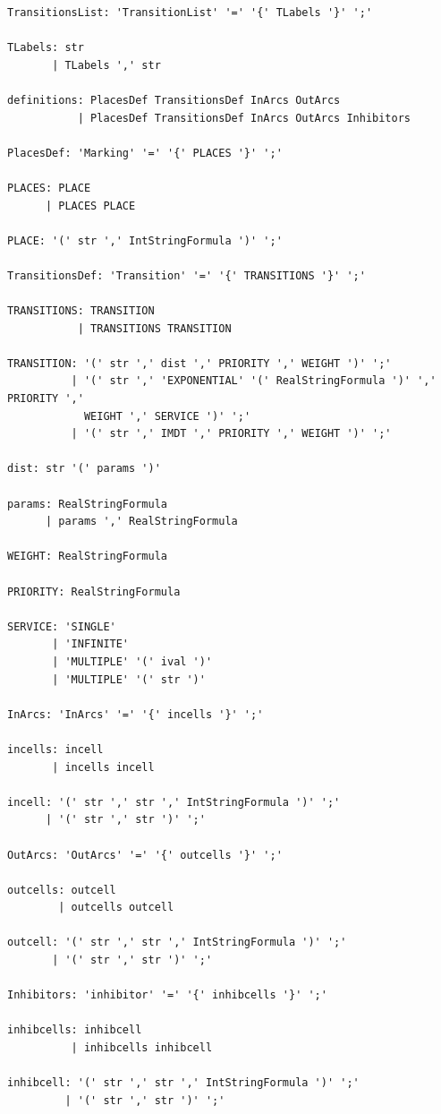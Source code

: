 \documentclass{article}
\begin{document}
\begin{verbatim}
TransitionsList: 'TransitionList' '=' '{' TLabels '}' ';'

TLabels: str
       | TLabels ',' str

definitions: PlacesDef TransitionsDef InArcs OutArcs
           | PlacesDef TransitionsDef InArcs OutArcs Inhibitors

PlacesDef: 'Marking' '=' '{' PLACES '}' ';'

PLACES: PLACE
      | PLACES PLACE

PLACE: '(' str ',' IntStringFormula ')' ';'

TransitionsDef: 'Transition' '=' '{' TRANSITIONS '}' ';'

TRANSITIONS: TRANSITION
           | TRANSITIONS TRANSITION

TRANSITION: '(' str ',' dist ',' PRIORITY ',' WEIGHT ')' ';'
          | '(' str ',' 'EXPONENTIAL' '(' RealStringFormula ')' ',' PRIORITY ',' 
            WEIGHT ',' SERVICE ')' ';'
          | '(' str ',' IMDT ',' PRIORITY ',' WEIGHT ')' ';'

dist: str '(' params ')'

params: RealStringFormula
      | params ',' RealStringFormula

WEIGHT: RealStringFormula

PRIORITY: RealStringFormula

SERVICE: 'SINGLE'
       | 'INFINITE'
       | 'MULTIPLE' '(' ival ')'
       | 'MULTIPLE' '(' str ')'

InArcs: 'InArcs' '=' '{' incells '}' ';'

incells: incell
       | incells incell

incell: '(' str ',' str ',' IntStringFormula ')' ';'
      | '(' str ',' str ')' ';'

OutArcs: 'OutArcs' '=' '{' outcells '}' ';'

outcells: outcell
        | outcells outcell

outcell: '(' str ',' str ',' IntStringFormula ')' ';'
       | '(' str ',' str ')' ';'

Inhibitors: 'inhibitor' '=' '{' inhibcells '}' ';'

inhibcells: inhibcell
          | inhibcells inhibcell

inhibcell: '(' str ',' str ',' IntStringFormula ')' ';'
         | '(' str ',' str ')' ';'
\end{verbatim}
\end{document}

